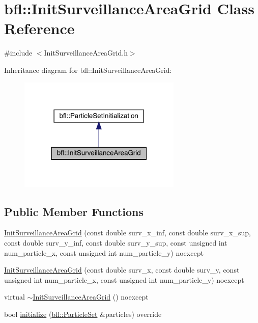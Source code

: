 \hypertarget{classbfl_1_1InitSurveillanceAreaGrid}{}\section{bfl\+:\+:Init\+Surveillance\+Area\+Grid Class Reference}
\label{classbfl_1_1InitSurveillanceAreaGrid}


{\ttfamily \#include $<$Init\+Surveillance\+Area\+Grid.\+h$>$}



Inheritance diagram for bfl\+:\+:Init\+Surveillance\+Area\+Grid\+:
\nopagebreak
\begin{figure}[H]
\begin{center}
\leavevmode
\includegraphics[width=220pt]{classbfl_1_1InitSurveillanceAreaGrid__inherit__graph}
\end{center}
\end{figure}
\subsection*{Public Member Functions}
\begin{DoxyCompactItemize}
\item 
\mbox{\hyperlink{classbfl_1_1InitSurveillanceAreaGrid_aef76c5f20e40fce325f8d79c36488816}{Init\+Surveillance\+Area\+Grid}} (const double surv\+\_\+x\+\_\+inf, const double surv\+\_\+x\+\_\+sup, const double surv\+\_\+y\+\_\+inf, const double surv\+\_\+y\+\_\+sup, const unsigned int num\+\_\+particle\+\_\+x, const unsigned int num\+\_\+particle\+\_\+y) noexcept
\item 
\mbox{\hyperlink{classbfl_1_1InitSurveillanceAreaGrid_a5f8d40885ea408d56bd034193e7ef2f8}{Init\+Surveillance\+Area\+Grid}} (const double surv\+\_\+x, const double surv\+\_\+y, const unsigned int num\+\_\+particle\+\_\+x, const unsigned int num\+\_\+particle\+\_\+y) noexcept
\item 
virtual \mbox{\hyperlink{classbfl_1_1InitSurveillanceAreaGrid_af2d46f38d95e7a5b955c3b28148bdb6d}{$\sim$\+Init\+Surveillance\+Area\+Grid}} () noexcept
\item 
bool \mbox{\hyperlink{classbfl_1_1InitSurveillanceAreaGrid_a77598c277d7a25b4ee31791cc71da7b7}{initialize}} (\mbox{\hyperlink{classbfl_1_1ParticleSet}{bfl\+::\+Particle\+Set}} \&particles) override
\end{DoxyCompactItemize}
